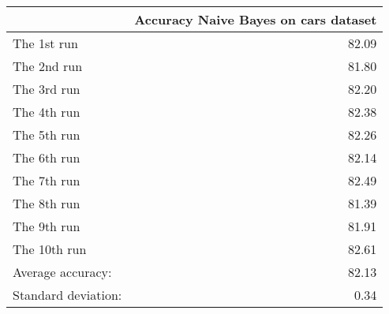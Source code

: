 \begin{tabular}{lr}
\toprule
{} &  Accuracy Naive Bayes on cars dataset \\
\midrule
The 1st run         &                                 82.09 \\
The 2nd run         &                                 81.80 \\
The 3rd run         &                                 82.20 \\
The 4th run         &                                 82.38 \\
The 5th run         &                                 82.26 \\
The 6th run         &                                 82.14 \\
The 7th run         &                                 82.49 \\
The 8th run         &                                 81.39 \\
The 9th run         &                                 81.91 \\
The 10th run        &                                 82.61 \\
Average accuracy:   &                                 82.13 \\
Standard deviation: &                                  0.34 \\
\bottomrule
\end{tabular}
